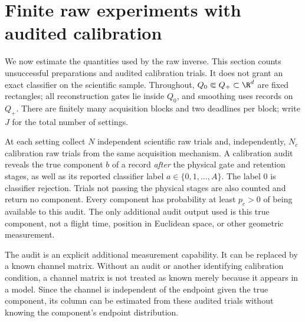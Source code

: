 \section{Finite raw experiments with audited calibration}
\label{sec:v80-finite}

We now estimate the quantities used by the raw inverse.  This section
counts unsuccessful preparations and audited calibration trials.  It
does not grant an exact classifier on the scientific sample.
Throughout, $Q_0\Subset Q_+\subset\R^d$ are fixed rectangles;
all reconstruction gates lie inside $Q_0$, and smoothing uses records
on $Q_+$.  There are finitely many acquisition blocks and two deadlines
per block; write $J$ for the total number of settings.

\begin{definition}\label{def:v80-calibration}
At each setting collect $N$ independent scientific raw trials and,
independently, $N_c$ calibration raw trials from the same acquisition
mechanism.  A calibration audit reveals the true component $b$ of a
record \emph{after} the physical gate and retention stages, as well as
its reported classifier label $a\in\{0,1,\ldots,A\}$.  The label $0$
is classifier rejection.  Trials not passing the physical stages are
also counted and return no component.  Every component has probability
at least $p_c>0$ of being available to this audit.  The only additional
audit output used is this true component, not a flight time, position in
Euclidean space, or other geometric measurement.
\end{definition}

The audit is an explicit additional measurement capability.  It can be
replaced by a known channel matrix.  Without an audit or another
identifying calibration condition, a channel matrix is not treated as
known merely because it appears in a model.  Since the channel is
independent of the endpoint given the true component, its column can
be estimated from these audited trials without knowing the component's
endpoint distribution.

